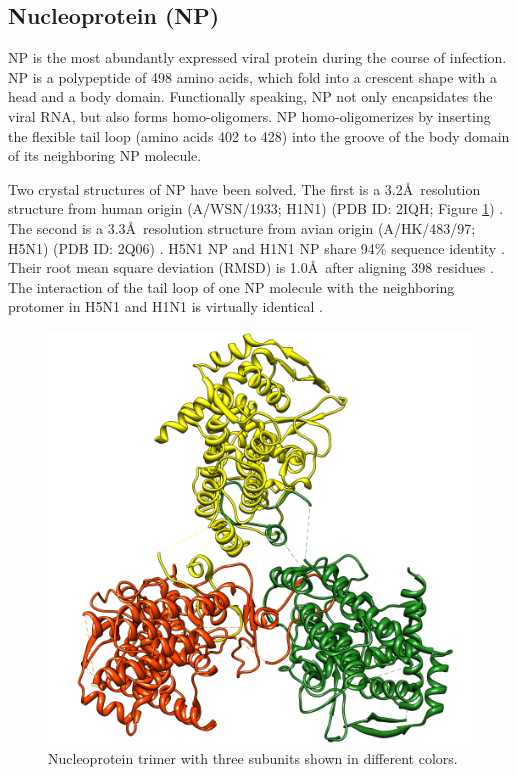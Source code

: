 \subsection{Nucleoprotein (NP)}

NP is the most abundantly expressed viral protein during the course of infection. NP is a polypeptide of 498 amino acids, which fold into a crescent shape with a head and a body domain. Functionally speaking, NP not only encapsidates the viral RNA, but also forms homo-oligomers. NP homo-oligomerizes by inserting the flexible tail loop (amino acids 402 to 428) into the groove of the body domain of its neighboring NP molecule.

Two crystal structures of NP have been solved. The first is a 3.2\AA\ resolution structure from human origin (A/WSN/1933; H1N1) (PDB ID: 2IQH; Figure \ref{influenza:2IQH}) \citep{1140}. The second is a 3.3\AA\ resolution structure from avian origin (A/HK/483/97; H5N1) (PDB ID: 2Q06) \citep{1231}. H5N1 NP and H1N1 NP share 94\% sequence identity \citep{1231}. Their root mean square deviation (RMSD) is 1.0\AA\ after aligning 398 residues \citep{1231}. The interaction of the tail loop of one NP molecule with the neighboring protomer in H5N1 and H1N1 is virtually identical \citep{1231}.

\begin{figure}
\centering
\includegraphics[width=\linewidth]{../influenza/2IQH.png}
\caption{Nucleoprotein trimer with three subunits shown in different colors.}
\label{influenza:2IQH}
\end{figure}

